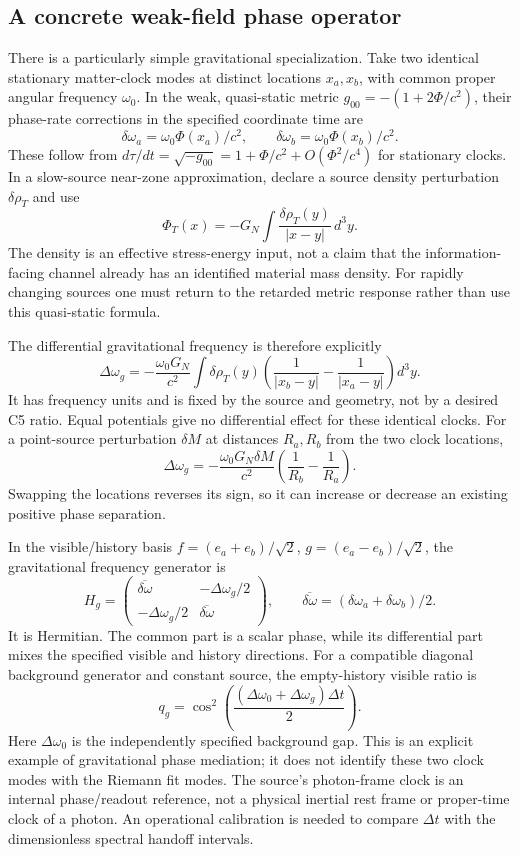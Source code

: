 \documentclass[11pt,a4paper]{article}
\begin{document}
\subsection{A concrete weak-field phase operator}
There is a particularly simple gravitational specialization. Take
two identical stationary matter-clock modes at distinct locations
$x_a,x_b$, with common proper angular frequency $\omega_0$.
In the weak, quasi-static metric
$g_{00}=-(1+2\Phi/c^2)$, their phase-rate corrections in the specified
coordinate time are
\[
 \delta\omega_a=\omega_0\Phi(x_a)/c^2,
 \qquad\delta\omega_b=\omega_0\Phi(x_b)/c^2.
\]
These follow from $d\tau/dt=\sqrt{-g_{00}}
=1+\Phi/c^2+O(\Phi^2/c^4)$ for stationary clocks.
In a slow-source near-zone approximation, declare a source density
perturbation $\delta\rho_T$ and use
\[
 \Phi_T(x)=-G_N\int
 \frac{\delta\rho_T(y)}{|x-y|}\,d^3y.
\]
The density is an effective stress-energy input, not a claim that
the information-facing channel already has an identified material
mass density. For rapidly changing sources one must return to the
retarded metric response rather than use this quasi-static formula.

The differential gravitational frequency is therefore explicitly
\[
 \Delta\omega_g
 =-\frac{\omega_0G_N}{c^2}\int\delta\rho_T(y)
 \left(\frac1{|x_b-y|}-\frac1{|x_a-y|}\right)d^3y.
\]
It has frequency units and is fixed by the source and geometry,
not by a desired C5 ratio. Equal potentials give no differential
effect for these identical clocks. For a point-source perturbation
$\delta M$ at distances $R_a,R_b$ from the two clock locations,
\[
 \Delta\omega_g
 =-\frac{\omega_0G_N\delta M}{c^2}
 \left(\frac1{R_b}-\frac1{R_a}\right).
\]
Swapping the locations reverses its sign, so it can increase or
decrease an existing positive phase separation.

In the visible/history basis
$f=(e_a+e_b)/\sqrt2$, $g=(e_a-e_b)/\sqrt2$, the gravitational
frequency generator is
\[
 H_g=
 \begin{pmatrix}
 \overline{\delta\omega}&-\Delta\omega_g/2\\
 -\Delta\omega_g/2&\overline{\delta\omega}
 \end{pmatrix},
 \qquad
 \overline{\delta\omega}
 =(\delta\omega_a+\delta\omega_b)/2.
\]
It is Hermitian. The common part is a scalar phase, while its
differential part mixes the specified visible and history directions.
For a compatible diagonal background generator and constant source,
the empty-history visible ratio is
\[
 q_g=\cos^2\!\left(
 \frac{(\Delta\omega_0+\Delta\omega_g)\Delta t}{2}\right).
\]
Here $\Delta\omega_0$ is the independently specified background gap.
This is an explicit example of gravitational phase mediation; it
does not identify these two clock modes with the Riemann fit modes.
The source's photon-frame clock is an internal phase/readout reference,
not a physical inertial rest frame or proper-time clock of a photon.
An operational calibration is needed to compare $\Delta t$ with
the dimensionless spectral handoff intervals.
\end{document}
